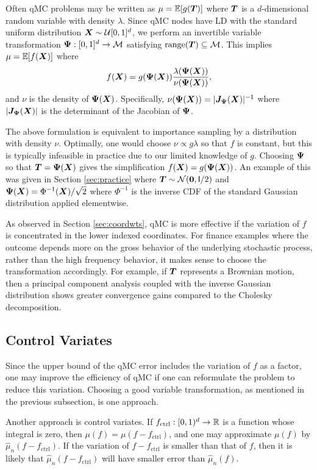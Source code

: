 \documentclass{svproc}
\begin{document}
Often qMC problems may be written as $\mu = {\mathbb{E}}[g({\boldsymbol{T}})]$ where ${\boldsymbol{T}}$ is a $d$-dimensional random variable with density $\lambda$. Since qMC nodes have LD with the standard uniform distribution ${\boldsymbol{X}} \sim {\mathcal{U}}[0,1]^d$, we perform an invertible variable transformation ${\boldsymbol{\Psi}}: [0,1]^d \to {\mathcal{M}}$ satisfying $\mathrm{range}({\boldsymbol{T}}) \subseteq {\mathcal{M}}$. This implies
$\mu = {\mathbb{E}}[f({\boldsymbol{X}})]$ where  
$$
f({\boldsymbol{X}}) = g({\boldsymbol{\Psi}}({\boldsymbol{X}})) \frac{\lambda ({\boldsymbol{\Psi}}({\boldsymbol{X}}))}{\nu({\boldsymbol{\Psi}}({\boldsymbol{X}}))},
$$
and $\nu$ is the density of ${\boldsymbol{\Psi}}({\boldsymbol{X}})$. Specifically, $\nu({\boldsymbol{\Psi}}({\boldsymbol{X}}))= \lvert {\boldsymbol{J}}_{\boldsymbol{\Psi}}({\boldsymbol{X}}) \rvert^{-1}$ where $\lvert {\boldsymbol{J}}_{\boldsymbol{\Psi}}({\boldsymbol{X}}) \rvert$ is the determinant of the Jacobian of ${\boldsymbol{\Psi}}$. 

The above formulation is equivalent to importance sampling by a distribution with density $\nu$. Optimally, one would choose $\nu \propto g\lambda$ so that $f$ is constant, but this is typically infeasible in practice due to our limited knowledge of $g$. Choosing ${\boldsymbol{\Psi}}$ so that ${\boldsymbol{T}} = {\boldsymbol{\Psi}}({\boldsymbol{X}})$ gives the simplification $f({\boldsymbol{X}}) = g({\boldsymbol{\Psi}}({\boldsymbol{X}}))$. An example of this was given in Section \ref{sec:practice} where ${\boldsymbol{T}} \sim {\mathcal{N}}(\boldsymbol{0},\mathsf{I}/2)$ and ${\boldsymbol{\Psi}}({\boldsymbol{X}}) = \Phi^{-1}({\boldsymbol{X}})/\sqrt{2}$ where $\Phi^{-1}$ is the inverse CDF of the standard Gaussian distribution applied elementwise.

As observed in Section \ref{sec:coordwts}, qMC is more effective if the variation of $f$ is concentrated in the lower indexed coordinates.  For finance examples where the outcome depends more on the gross behavior of the underlying stochastic process, rather than the high frequency behavior, it makes sense to choose the transformation accordingly.  For example, if ${\boldsymbol{T}}$ represents a Brownian motion, then a principal component analysis coupled with the inverse Gaussian distribution shows greater convergence gains compared to the Cholesky decomposition.

\subsection{Control Variates} 

Since the upper bound of the qMC error includes the variation of $f$ as a factor, one may improve the efficiency of qMC if one can reformulate the problem to reduce this variation.  Choosing a good variable transformation, as mentioned in the previous subsection, is one approach.  

Another approach is control variates.  If $f_{\text{ctrl}} : [0,1)^d \to {\mathbb{R}}$ is a function whose integral is zero, then $\mu(f) = \mu(f - f_{\text{ctrl}})$, and one may approximate $\mu(f)$ by $\hat{\mu}_n(f - f_{\text{ctrl}})$.  If the variation of  $f - f_{\text{ctrl}}$ is smaller than that of $f$, then it is likely that $\hat{\mu}_n(f - f_{\text{ctrl}})$ will have smaller error than $\hat{\mu}_n(f)$.  
\end{document}
